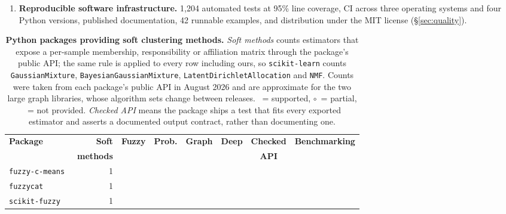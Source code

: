 \documentclass[twoside,11pt]{article}
\newcommand{\cmark}{\textcolor{green!70!black}{\ding{51}}}
\newcommand{\xmark}{\textcolor{red!75!black}{\ding{55}}}
\newcommand{\pmark}{\textcolor{orange!80!black}{$\circ$}}
\begin{document}
\begin{enumerate}[leftmargin=*,topsep=2pt,itemsep=1pt]
\item \textbf{Reproducible software infrastructure.}
1{,}204 automated tests at 95\% line coverage, CI across three operating
systems and four Python versions, published documentation, 42 runnable
examples, and distribution under the MIT license (\S\ref{sec:quality}).

\end{enumerate}




\begin{table}[t]
\centering
\footnotesize
\setlength{\tabcolsep}{4pt}
\renewcommand{\arraystretch}{1.15}

\caption{\textbf{Python packages providing soft clustering methods.}
\emph{Soft methods} counts estimators that expose a per-sample membership,
responsibility or affiliation matrix through the package's public API; the
same rule is applied to every row including ours, so \texttt{scikit-learn}
counts \texttt{GaussianMixture}, \texttt{BayesianGaussianMixture},
\texttt{LatentDirichletAllocation} and \texttt{NMF}. Counts were taken from
each package's public API in August 2026 and are approximate for the two
large graph libraries, whose algorithm sets change between releases.
\cmark~= supported, \pmark~= partial, \xmark~= not provided.
\emph{Checked API} means the package ships a test that fits every exported
estimator and asserts a documented output contract, rather than documenting
one.}
\label{tab:comparison}

\begin{tabular}{lrcccccc}
\toprule
\textbf{Package}
& \textbf{Soft}
& \textbf{Fuzzy}
& \textbf{Prob.}
& \textbf{Graph}
& \textbf{Deep}
& \textbf{Checked}
& \textbf{Benchmarking} \\
& \textbf{methods}
&
&
&
&
& \textbf{API}
& \\
\midrule

\texttt{fuzzy-c-means}~\citep{dias2019fuzzy}
& 1 & \cmark & \xmark & \xmark & \xmark & \xmark & \xmark \\

\texttt{fuzzycat}~\citep{oliver_fuzzycat}
& 1 & \cmark & \xmark & \xmark & \xmark & \xmark & \xmark \\

\texttt{scikit-fuzzy}~\citep{scikit_fuzzy_2024}
& 1 & \cmark & \xmark & \xmark & \xmark & \xmark & \xmark \\


\end{tabular}
\end{table}
\end{document}
